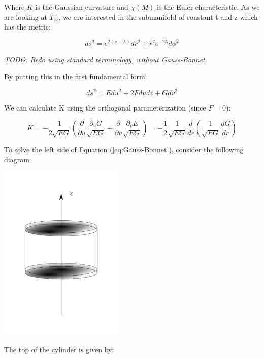 \documentclass{article}
\begin{document}
Where $K$ is the Gaussian curvature and $\chi (M)$ is the Euler characteristic. As we are looking at $T_{zz}$, we are interested in the submanifold of constant t and z which has the metric:

\begin{equation}
ds^{2}=e^{2\left(\nu-\lambda\right)}dr^{2}+r^{2}e^{-2\lambda}d\phi^{2}\label{eq:disk-metric}
\end{equation}

\emph{TODO: Redo using standard terminology, without Gauss-Bonnet}

By putting this in the first fundamental form\cite{first_fundamental-form}:

\begin{equation}
ds^{2}=Edu^{2}+2Fdudv+Gdv^{2}
\end{equation}

We can calculate K using the orthogonal parameterization\cite{schleifer_condition_1985} (since $F=0$):

\begin{equation}
K=-\frac{1}{2\sqrt{EG}}\left(\frac{\partial}{\partial u}\frac{\partial_{u}G}{\sqrt{EG}}+\frac{\partial}{\partial v}\frac{\partial_{v}E}{\sqrt{EG}}\right)=-\frac{1}{2}\frac{1}{\sqrt{EG}}\frac{d}{dr}\left(\frac{1}{\sqrt{EG}}\frac{dG}{dr}\right)
\end{equation}

To solve the left side of Equation (\ref{eq:Gauss-Bonnet}), consider the following diagram:

\begin{center}
\includegraphics[width=60mm]{Figure3.png}
\end{center}

The top of the cylinder is given by:
\end{document}
